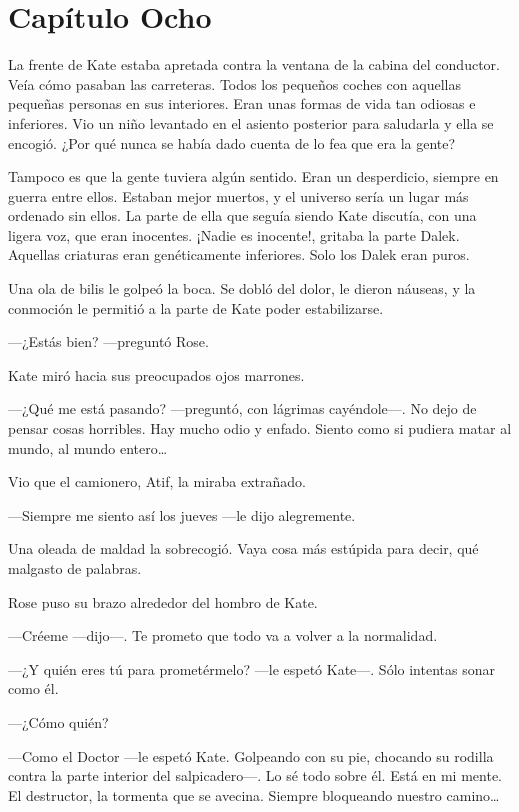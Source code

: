 \chapter*{Capítulo Ocho}

La frente de Kate estaba apretada contra la ventana de la cabina del
conductor. Veía cómo pasaban las carreteras. Todos los pequeños coches
con aquellas pequeñas personas en sus interiores. Eran unas formas de
vida tan odiosas e inferiores. Vio un niño levantado en el asiento
posterior para saludarla y ella se encogió. ¿Por qué nunca se había dado
cuenta de lo fea que era la gente?

Tampoco es que la gente tuviera algún sentido. Eran un desperdicio,
siempre en guerra entre ellos. Estaban mejor muertos, y el universo
sería un lugar más ordenado sin ellos. La parte de ella que seguía
siendo Kate discutía, con una ligera voz, que eran inocentes. ¡Nadie es
inocente!, gritaba la parte Dalek. Aquellas criaturas eran genéticamente
inferiores. Solo los Dalek eran puros.

Una ola de bilis le golpeó la boca. Se dobló del dolor, le dieron
náuseas, y la conmoción le permitió a la parte de Kate poder
estabilizarse.

---¿Estás bien? ---preguntó Rose.

Kate miró hacia sus preocupados ojos marrones.

---¿Qué me está pasando? ---preguntó, con lágrimas cayéndole---. No dejo de
pensar cosas horribles. Hay mucho odio y enfado. Siento como si pudiera
matar al mundo, al mundo entero\ldots{}

Vio que el camionero, Atif, la miraba extrañado.

---Siempre me siento así los jueves ---le dijo alegremente.

Una oleada de maldad la sobrecogió. Vaya cosa más estúpida para decir,
qué malgasto de palabras.

Rose puso su brazo alrededor del hombro de Kate.

---Créeme ---dijo---. Te prometo que todo va a volver a la normalidad.

---¿Y quién eres tú para prometérmelo? ---le espetó Kate---. Sólo intentas
sonar como él.

---¿Cómo quién?

---Como el Doctor ---le espetó Kate. Golpeando con su pie, chocando su
rodilla contra la parte interior del salpicadero---. Lo sé todo sobre él.
Está en mi mente. El destructor, la tormenta que se avecina. Siempre
bloqueando nuestro camino\ldots{}

